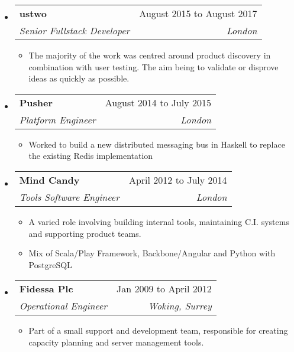 \documentclass[letterpaper,12pt]{article}[leftmargin=*]
\makeatletter
\def \entryspacing {-0pt}
\newenvironment{resumeEntry}[0]{
  \begin{itemize}[leftmargin=2.5mm]
  }{
  \end{itemize}\vspace{\entryspacing}
}
\newenvironment{resumeItemList}[0]{
  \begin{itemize}[leftmargin=4.5mm]
  }{
  \end{itemize}
}
\newcommand{\resumeItem}[1]{
  \item\small{
    {#1 \vspace{-2pt}}
  }
}
\newcommand{\resumeEntryTSDL}[4]{
  \vspace{-1pt}\item[]
    \begin{tabularx}{0.97\textwidth}{X@{\hspace{60pt}}r}
      \textbf{\color{primary}#1} & {\firabook\color{accent}\small#2} \\
      \textit{\color{accent}\small#3} & \textit{\color{accent}\small#4} \\
    \end{tabularx}\vspace{-6pt}
}
\makeatother
\begin{document}

  \begin{resumeEntry}
    \resumeEntryTSDL{ustwo}{August 2015 to August 2017}{Senior Fullstack Developer}{London}
    \begin{resumeItemList}
      \resumeItem{The majority of the work was centred around product discovery in combination with user testing. The aim being to validate or disprove ideas as quickly as possible.}
    \end{resumeItemList}
  \end{resumeEntry}

  \begin{resumeEntry}
    \resumeEntryTSDL{Pusher}{August 2014 to July 2015}
      {Platform Engineer}{London}
    \begin{resumeItemList}
      \resumeItem{Worked to build a new distributed messaging bus in Haskell to replace the existing Redis implementation}
    \end{resumeItemList}
  \end{resumeEntry}

  \begin{resumeEntry}
    \resumeEntryTSDL{Mind Candy}{April 2012 to July 2014}{Tools Software Engineer}{London}
    \begin{resumeItemList}
      \resumeItem{A varied role involving building internal tools, maintaining C.I. systems and supporting product teams.}
      \resumeItem{Mix of Scala/Play Framework, Backbone/Angular and Python with PostgreSQL}
    \end{resumeItemList}
  \end{resumeEntry}

  \begin{resumeEntry}
    \resumeEntryTSDL{Fidessa Plc}{Jan 2009 to April 2012}{Operational Engineer}{Woking, Surrey}
    \begin{resumeItemList}
      \resumeItem{Part of a small support and development team, responsible for creating capacity planning and server management tools.}
    \end{resumeItemList}
  \end{resumeEntry}
\end{document}
